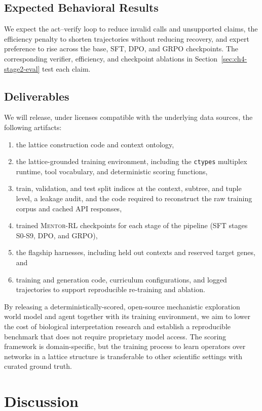 \subsection{Expected Behavioral Results}
We expect the act--verify loop to reduce invalid calls and unsupported claims, the efficiency penalty to shorten trajectories without reducing recovery, and expert preference to rise across the base, SFT, DPO, and GRPO checkpoints. The corresponding verifier, efficiency, and checkpoint ablations in Section~\ref{sec:ch4-stage2-eval} test each claim.

\subsection{Deliverables}\label{sec:ch4-deliverables}
We will release, under licenses compatible with the underlying data sources, the following artifacts:
\begin{enumerate}
    \item the lattice construction code and context ontology,
    \item the lattice-grounded training environment, including the \texttt{ctypes} multiplex runtime, tool vocabulary, and deterministic scoring functions,
    \item train, validation, and test split indices at the context, subtree, and tuple level, a leakage audit, and the code required to reconstruct the raw training corpus and cached API responses,
    \item trained \textsc{Mentor-RL} checkpoints for each stage of the pipeline (SFT stages S0-S9, DPO, and GRPO),
    \item the flagship harnesses, including held out contexts and reserved target genes, and
    \item training and generation code, curriculum configurations, and logged trajectories to support reproducible re-training and ablation.
\end{enumerate}

By releasing a deterministically-scored, open-source mechanistic exploration world model and agent together with its training environment, we aim to lower the cost of biological interpretation research and establish a reproducible benchmark that does not require proprietary model access. The scoring framework is domain-specific, but the training process to learn operators over networks in a lattice structure is transferable to other scientific settings with curated ground truth.

\section{Discussion}
